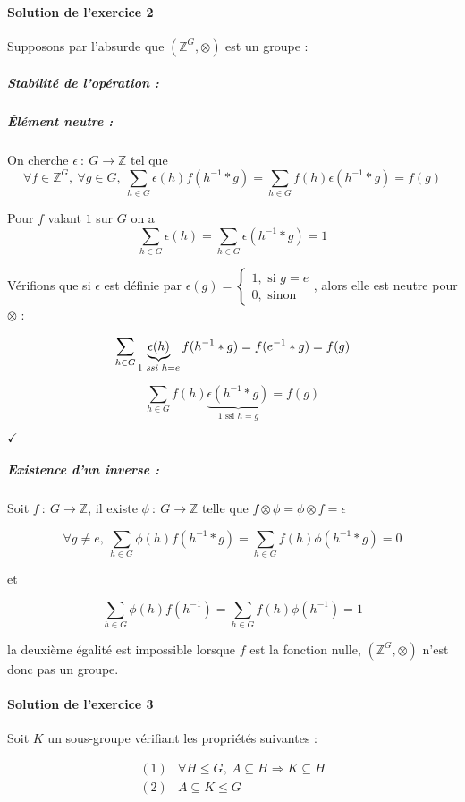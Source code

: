 \documentclass[]{article}
\theoremstyle{remark}
\theoremstyle{definition}
\newcommand{\checked}{
	\hfill$\checkmark$
}
\newcommand{\funcshort}[3]{
#1 ~ : ~ #2 \longrightarrow #3
}
\begin{document}
\paragraph{Solution de l'exercice 2}

Supposons par l'absurde que $\left(\mathbb{Z}^G, \otimes\right)$ est un groupe :

\subparagraph{Stabilité de l'opération :} \checkmark

\subparagraph{Élément neutre :} On cherche $\funcshort{\epsilon}{G}{\mathbb{Z}}$ tel que
$$\forall f \in \mathbb{Z}^G, ~ \forall g \in G, ~ \sum_{h \in G}\epsilon(h)f(h^{-1}*g)=\sum_{h \in G}f(h)\epsilon(h^{-1}*g)=f(g)$$

Pour $f$ valant $1$ sur $G$ on a
$$\sum_{h \in G}\epsilon(h)=\sum_{h \in G}\epsilon(h^{-1}*g)=1$$

Vérifions que si $\epsilon$ est définie par $\epsilon(g) = \left\{
\begin{array}{l}
	1, \text{ si } g = e \\
	0, \text{ sinon}
\end{array}
\right.$, alors elle est neutre pour $\otimes$ :

$$\sum_{h \in G}\underbrace{\epsilon(h)}_{1 \text{ \textit{ssi} } h = e}f(h^{-1}*g) = f(e^{-1}*g) = f(g)$$

$$\sum_{h \in G}f(h)\underbrace{\epsilon(h^{-1}*g)}_{1 \text{ ssi } h = g}=f(g)$$

\checked

\subparagraph{Existence d'un inverse :}
Soit $\funcshort{f}{G}{\mathbb{Z}}$, il existe $\funcshort{\phi}{G}{\mathbb{Z}}$ telle que $f \otimes \phi = \phi \otimes f = \epsilon$

$$\forall g \neq e, ~ \sum_{h \in G}\phi(h)f(h^{-1}*g)=\sum_{h \in G}f(h)\phi(h^{-1}*g)=0$$

et

$$\sum_{h \in G}\phi(h)f(h^{-1})=\sum_{h \in G}f(h)\phi(h^{-1})=1$$

la deuxième égalité est impossible lorsque $f$ est la fonction nulle, $\left(\mathbb{Z}^G, \otimes\right)$ n'est donc pas un groupe.

\paragraph{Solution de l'exercice 3}
Soit $K$ un sous-groupe vérifiant les propriétés suivantes :

$$
	\begin{array}{lc}
		(1) & \forall H \leqslant G, ~ A \subseteq H \Longrightarrow K \subseteq H \\
		(2) & A \subseteq K \leqslant G
	\end{array}
$$
\end{document}

